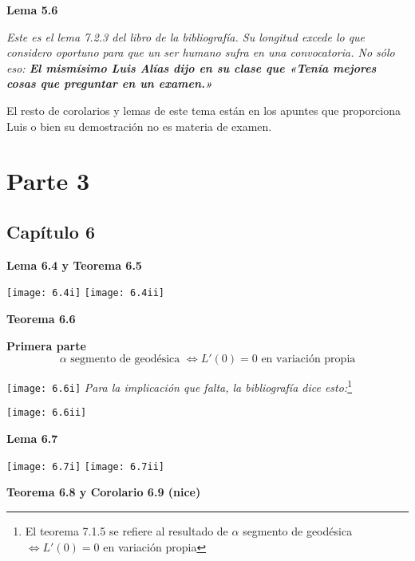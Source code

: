 \documentclass[openany]{book}
\begin{document}
\begin{center}
\textbf{Lema 5.6}
\end{center}
\textit{Este es el lema 7.2.3 del libro de la bibliografía. Su longitud excede lo que considero oportuno para que un ser humano sufra en una convocatoria. No sólo eso: \textbf{El mismísimo Luis Alías dijo en su clase que «Tenía mejores cosas que preguntar en un examen.»}}


El resto de corolarios y lemas de este tema están en los apuntes que proporciona Luis o bien su demostración no es materia de examen.


\part{Parte 3}

\chapter{Capítulo 6}

\begin{center}
\textbf{Lema 6.4 y Teorema 6.5}
\end{center}

\texttt{[image: 6.4i]}
\texttt{[image: 6.4ii]}



\begin{center}
\textbf{Teorema 6.6}
\end{center}

\begin{center}
\textbf{Primera parte}
$$ \alpha \text{ segmento de geodésica } \iff L'(0)=0 \text{ en variación propia} $$
\end{center}
\texttt{[image: 6.6i]}
\newpage
\textit{Para la implicación que falta, la bibliografía dice esto:}\footnote{El teorema 7.1.5 se refiere al resultado de $\alpha$ segmento de geodésica $\iff L'(0)=0$ en variación propia}

\texttt{[image: 6.6ii]}

\begin{center}
\textbf{Lema 6.7}
\end{center}

\texttt{[image: 6.7i]}
\texttt{[image: 6.7ii]}



\begin{center}
\textbf{Teorema 6.8 y Corolario 6.9 (nice)}
\end{center}
\end{document}
